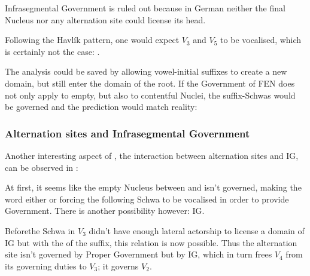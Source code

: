 Infrasegmental Government is ruled out because in German
neither the final Nucleus nor any alternation site could
license its head.

Following the Havlík pattern, one would expect $V_3$ and $V_5$
to be vocalised, which is certainly not the case: \ti{*[hand@ln@s]}.

The analysis could be saved by allowing vowel-initial suffixes
to create a new domain, but still enter the domain of the root.
If the Government of \gls{FEN} does not only apply to empty,
but also to contentful Nuclei, the suffix-Schwas would be governed
and the prediction would match reality:
\begin{structure}{ }
  \emptyV[gov]
  \V[floating]{\textschwa}
  \fen[domain]
  \V[floating]{\textschwa}
  \fen[domain]
  \V[floating]{\textschwa}
  \fen
\end{structure}


\subsubsection{Alternation sites and Infrasegmental Government}
Another interesting aspect of \CVCV, the interaction between alternation
sites and \gls{IG}, can be observed in :
\begin{structure}{ \ti{[handlUN]}}
  \emptyV[nogov]
  \V[floating]{\textschwa}
  \Ng[nolic]
  \fen
\end{structure}
At first, it seems like the empty Nucleus between \ti{[n]} and \ti{[d]}
isn't governed, making the word either  or forcing
the following Schwa to be vocalised in order to provide Government.
There is another possibility however: \acrlong{IG}.

Before\co the Schwa in $V_3$ didn't have
enough lateral actorship to license a domain of \gls{IG}\co
but with the \ti{[U]} of the suffix, this relation is
now possible. Thus the alternation site isn't governed
by Proper Government but by \gls{IG}, which in turn frees $V_4$ from
its governing duties to $V_3$; it governs $V_2$\footnotemark.

